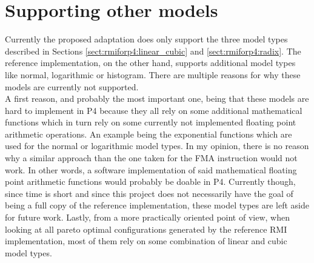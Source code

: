\section{Supporting other models}
Currently the proposed adaptation does only support the three model types described in Sections \ref{sect:rmiforp4:linear_cubic} and \ref{sect:rmiforp4:radix}. The reference implementation, on the other hand, supports additional model types like normal, logarithmic or histogram. There are multiple reasons for why these models are currently not supported.\\

A first reason, and probably the most important one, being that these models are hard to implement in P4 because they all rely on some additional mathematical functions which in turn rely on some currently not implemented floating point arithmetic operations. An example being the exponential functions which are used for the normal or logarithmic model types. In my opinion, there is no reason why a similar approach than the one taken for the FMA instruction would not work. In other words, a software implementation of said mathematical floating point arithmetic functions would probably be doable in P4. Currently though, since time is short and since this project does not necessarily have the goal of being a full copy of the reference implementation, these model types are left aside for future work. Lastly, from a more practically oriented point of view, when looking at all pareto optimal configurations generated by the reference RMI implementation, most of them rely on some combination of linear and cubic model types.
